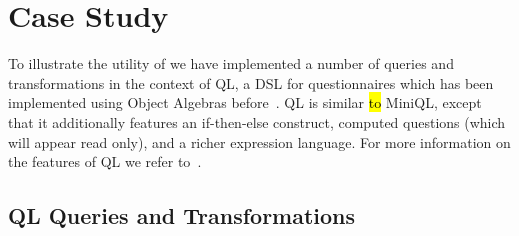 \section{Case Study}\label{sec:case_study}

To illustrate the utility of \name we have implemented a number of
queries and transformations in the context of QL, a DSL for
questionnaires which has been implemented using Object Algebras
before~\cite{gouseti14extensible}.  QL is similar \hl{to} MiniQL, except that
it additionally features an if-then-else construct, computed questions
(which will appear read only), and a richer expression language.  For
more information on the features of QL we refer
to~\cite{erdweg2013state}.




\subsection{QL Queries and Transformations}

